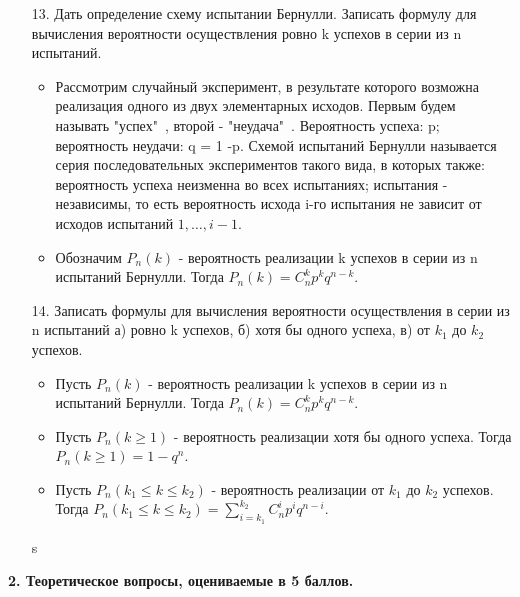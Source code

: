 \documentclass[a4paper]{article}
\begin{document}
\begin{enumerate}
\item[13.] Дать определение схему испытании Бернулли. Записать формулу для вычисления вероятности осуществления ровно k успехов в серии из n испытаний. \\
\begin{itemize}
\item Рассмотрим случайный эксперимент, в результате которого возможна реализация одного из двух элементарных исходов. Первым будем называть "успех"\ , второй - "неудача"\ . Вероятность успеха: p; вероятность неудачи: q = 1 -p. Схемой испытаний Бернулли называется серия последовательных экспериментов такого вида, в которых также: вероятность успеха неизменна во всех испытаниях; испытания - независимы, то есть вероятность исхода i-го испытания не зависит от исходов испытаний $1, \ldots, i-1$.
\item Обозначим $P_n(k)$ - вероятность реализации k успехов в серии из n испытаний Бернулли. Тогда $P_n(k) = C^k_n p^k q^{n - k}$.
\end{itemize}



\item[14.] Записать формулы для вычисления вероятности осуществления в серии из n испытаний а) ровно k успехов, б) хотя бы одного успеха, в) от $k_1$ до $k_2$ успехов.
\begin{itemize}
\item Пусть $P_n(k)$ - вероятность реализации k успехов в серии из n испытаний Бернулли. Тогда $P_n(k) = C^k_n p^k q^{n - k}$.
\item Пусть $P_n (k \geqslant 1)$ - вероятность реализации хотя бы одного успеха. Тогда $P_n(k \geqslant 1) = 1 - q^n$.
\item Пусть $P_n(k_1 \leqslant k \leqslant k_2)$ - вероятность реализации от $k_1$ до $k_2$ успехов. Тогда $P_n(k_1 \leqslant k \leqslant k_2) = \sum\limits_{i = k_1}^{k_2} C^i_n p^i q^{n - i}$.
\end{itemize}
s
\end{enumerate}





\begin{center}
\Large
\textbf{2. Теоретическое вопросы, оцениваемые в 5 баллов.} \\
\normalsize 
\end{center}
\end{document}
